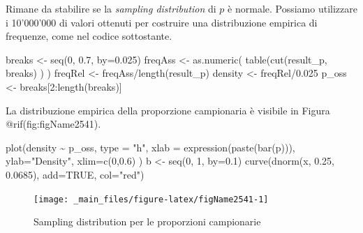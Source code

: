 \documentclass[a4paper,12pt,oneside]{book}
\newenvironment{Shaded}{\begin{snugshade}}{\end{snugshade}}
\newcommand{\DecValTok}[1]{#1}
\newcommand{\FloatTok}[1]{#1}
\newcommand{\ConstantTok}[1]{#1}
\newcommand{\SpecialCharTok}[1]{#1}
\newcommand{\StringTok}[1]{#1}
\newcommand{\OtherTok}[1]{#1}
\newcommand{\FunctionTok}[1]{#1}
\newcommand{\AttributeTok}[1]{#1}
\newcommand{\NormalTok}[1]{#1}
\begin{document}
Rimane da stabilire se la \emph{sampling distribution} di \(p\) è normale. Possiamo utilizzare i 10'000'000 di valori ottenuti per costruire una distribuzione empirica di frequenze, come nel codice sottostante.

\begin{Shaded}
\begin{Highlighting}[]
\NormalTok{breaks }\OtherTok{\textless{}{-}} \FunctionTok{seq}\NormalTok{(}\DecValTok{0}\NormalTok{, }\FloatTok{0.7}\NormalTok{, }\AttributeTok{by=}\FloatTok{0.025}\NormalTok{)}
\NormalTok{freqAss }\OtherTok{\textless{}{-}} \FunctionTok{as.numeric}\NormalTok{( }\FunctionTok{table}\NormalTok{(}\FunctionTok{cut}\NormalTok{(result\_p, breaks) ) ) }
\NormalTok{freqRel }\OtherTok{\textless{}{-}}\NormalTok{ freqAss}\SpecialCharTok{/}\FunctionTok{length}\NormalTok{(result\_p)}
\NormalTok{density }\OtherTok{\textless{}{-}}\NormalTok{ freqRel}\SpecialCharTok{/}\FloatTok{0.025}
\NormalTok{p\_oss }\OtherTok{\textless{}{-}}\NormalTok{ breaks[}\DecValTok{2}\SpecialCharTok{:}\FunctionTok{length}\NormalTok{(breaks)]}
\end{Highlighting}
\end{Shaded}

La distribuzione empirica della proporzione campionaria è visibile in Figura @rif(fig:figName2541).

\begin{Shaded}
\begin{Highlighting}[]
\FunctionTok{plot}\NormalTok{(density }\SpecialCharTok{\textasciitilde{}}\NormalTok{ p\_oss, }\AttributeTok{type =} \StringTok{"h"}\NormalTok{,}
     \AttributeTok{xlab =} \FunctionTok{expression}\NormalTok{(}\FunctionTok{paste}\NormalTok{(}\FunctionTok{bar}\NormalTok{(p))),}
     \AttributeTok{ylab=}\StringTok{"Density"}\NormalTok{, }
    \AttributeTok{xlim=}\FunctionTok{c}\NormalTok{(}\DecValTok{0}\NormalTok{,}\FloatTok{0.6}\NormalTok{) )}
\NormalTok{b }\OtherTok{\textless{}{-}} \FunctionTok{seq}\NormalTok{(}\DecValTok{0}\NormalTok{, }\DecValTok{1}\NormalTok{, }\AttributeTok{by=}\FloatTok{0.1}\NormalTok{)}
\FunctionTok{curve}\NormalTok{(}\FunctionTok{dnorm}\NormalTok{(x, }\FloatTok{0.25}\NormalTok{, }\FloatTok{0.0685}\NormalTok{), }\AttributeTok{add=}\ConstantTok{TRUE}\NormalTok{, }\AttributeTok{col=}\StringTok{"red"}\NormalTok{)}
\end{Highlighting}
\end{Shaded}

\begin{figure}

{\centering \texttt{[image: \_main\_files/figure-latex/figName2541-1]} 

}

\caption{Sampling distribution per le proporzioni campionarie}\label{fig:figName2541}
\end{figure}
\end{document}
